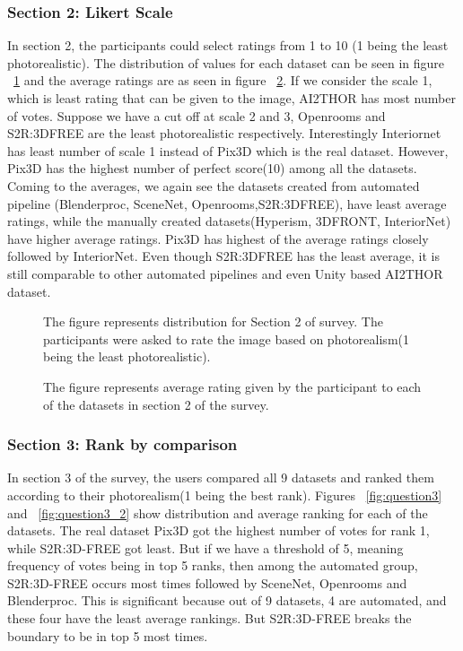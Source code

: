 \subsubsection{Section 2: Likert Scale}
In section 2, the participants could select ratings from 1 to 10 (1 being the least photorealistic).
The distribution of values for each dataset can be seen in figure ~\ref{fig:question2} and the average ratings are as seen in figure ~\ref{fig:question2_2}.
If we consider the scale 1, which is least rating that can be given to the image, AI2THOR has most number of votes.
Suppose we have a cut off at scale 2 and 3, Openrooms and S2R:3DFREE are the least photorealistic respectively.
Interestingly Interiornet has least number of scale 1 instead of Pix3D which is the real dataset.
However, Pix3D has the highest number of perfect score(10) among all the datasets.
Coming to the averages, we again see the datasets created from automated pipeline (Blenderproc, SceneNet, Openrooms,S2R:3DFREE), have least average ratings,
while the manually created datasets(Hyperism, 3DFRONT, InteriorNet) have higher average ratings.
Pix3D has highest of the average ratings closely followed by InteriorNet.
Even though S2R:3DFREE has the least average, it is still comparable to other automated pipelines and even Unity based AI2THOR dataset.

\begin{figure}
    \centering
    \resizebox{\textwidth}{!}{}
    \caption{The figure represents distribution for Section 2 of survey. The participants were asked to rate the image based on photorealism(1 being the least photorealistic).}
    \label{fig:question2}
\end{figure}

\begin{figure}
    \centering
    \resizebox{\textwidth}{!}{}
    \caption{The figure represents average rating given by the participant to each of the datasets in section 2 of the survey.}
    \label{fig:question2_2}
\end{figure}

\subsubsection{Section 3: Rank by comparison}
In section 3 of the survey, the users compared all 9 datasets and ranked them according to their photorealism(1 being the best rank).
Figures ~\ref{fig:question3} and ~\ref{fig:question3_2} show distribution and average ranking for each of the datasets.
The real dataset Pix3D got the highest number of votes for rank 1, while S2R:3D-FREE got least.
But if we have a threshold of 5, meaning frequency of votes being in top 5 ranks, then among the automated group, S2R:3D-FREE occurs most times followed by SceneNet, Openrooms and Blenderproc.
This is significant because out of 9 datasets, 4 are automated, and these four have the least average rankings.
But S2R:3D-FREE breaks the boundary to be in top 5 most times.

